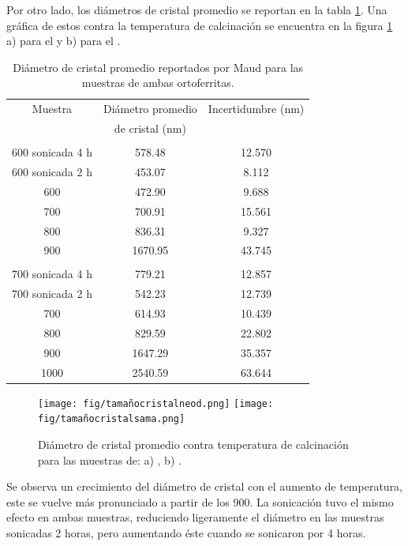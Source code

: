 \documentclass[../main.tex]{subfiles}
\begin{document}
Por otro lado, los diámetros de cristal promedio se reportan en la tabla \ref{tabla:tamañoscristal}. Una gráfica de estos contra la temperatura de calcinación se encuentra en la figura \ref{fig:tamañoscristal} a) para el \neod{} y b) para el \sama{}.
\begin{table}[H]
    \centering
    \begin{tabular}{|c||c|c|}
        \hline
        Muestra & Diámetro promedio  & Incertidumbre (nm) \\
        & de cristal (nm) & \\
        \hline\hline
        \multicolumn{3}{|c|}{\neod{}} \\
        \hline
        600\gradoC{} sonicada 4 h & 578.48 & 12.570 \\
        \hline
        600\gradoC{} sonicada 2 h & 453.07 & 8.112 \\
        \hline
        600\gradoC{} & 472.90 & 9.688 \\
        \hline
        700\gradoC{} & 700.91 & 15.561 \\
        \hline
        800\gradoC{} & 836.31 & 9.327 \\
        \hline
        900\gradoC{} & 1670.95 & 43.745 \\
        \hline
        \multicolumn{3}{|c|}{\sama{}} \\
        \hline
        700\gradoC{} sonicada 4 h & 779.21 & 12.857 \\
        \hline
        700\gradoC{} sonicada 2 h & 542.23 & 12.739 \\
        \hline
        700\gradoC{} & 614.93 & 10.439 \\
        \hline
        800\gradoC{} & 829.59 & 22.802 \\
        \hline
        900\gradoC{} & 1647.29 & 35.357 \\
        \hline
        1000\gradoC{} & 2540.59 & 63.644 \\
        \hline
        \end{tabular} 
    \caption{Diámetro de cristal promedio reportados por Maud para las muestras de ambas ortoferritas.}
    \label{tabla:tamañoscristal}
\end{table}
\begin{figure}[H]
    \centering
    \texttt{[image: fig/tamañocristalneod.png]}
    \quad
    \texttt{[image: fig/tamañocristalsama.png]}
    \caption{Diámetro de cristal promedio contra temperatura de calcinación para las muestras de: a) \neod, b) \sama.}
    \label{fig:tamañoscristal}
\end{figure}
Se observa un crecimiento del diámetro de cristal con el aumento de temperatura, este se vuelve más pronunciado a partir de los 900\gradoC{}. La sonicación tuvo el mismo efecto en ambas muestras, reduciendo ligeramente el diámetro en las muestras sonicadas 2 horas, pero aumentando éste cuando se sonicaron por 4 horas.
\end{document}
